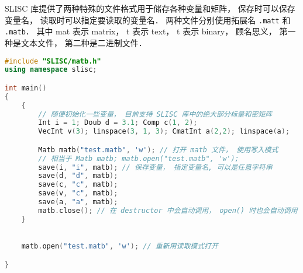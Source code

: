 

SLISC 库提供了两种特殊的文件格式用于储存各种变量和矩阵， 保存时可以保存变量名， 读取时可以指定要读取的变量名． 两种文件分别使用拓展名 \verb|.matt| 和 \verb|.matb|． 其中 mat 表示 matrix， t 表示 text， t 表示 binary， 顾名思义， 第一种是文本文件， 第二种是二进制文件．

\begin{lstlisting}[language=cpp]
#include "SLISC/matb.h"
using namespace slisc;

int main()
{
    {
        // 随便初始化一些变量， 目前支持 SLISC 库中的绝大部分标量和密矩阵
        Int i = 1; Doub d = 3.1; Comp c(1, 2);
        VecInt v(3); linspace(3, 1, 3); CmatInt a(2,2); linspace(a);

        Matb matb("test.matb", 'w'); // 打开 matb 文件， 使用写入模式
        // 相当于 Matb matb; matb.open("test.matb", 'w');
        save(i, "i", matb); // 保存变量， 指定变量名, 可以是任意字符串
        save(d, "d", matb);
        save(c, "c", matb);
        save(v, "c", matb);
        save(a, "a", matb);
        matb.close(); // 在 destructor 中会自动调用， open() 时也会自动调用
    }
    

    matb.open("test.matb", 'w'); // 重新用读取模式打开

}
\end{lstlisting}
